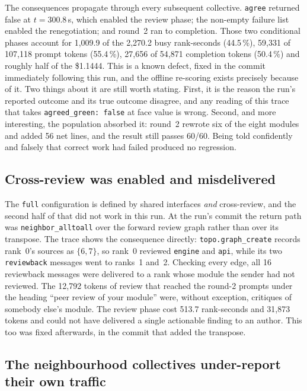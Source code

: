 \documentclass[11pt]{article}
\begin{document}
The consequences propagate through every subsequent collective. \texttt{agree} returned false
at $t=300.8$\,s, which enabled the review phase; the non-empty failure list enabled the
renegotiation; and round~2 ran to completion. Those two conditional phases account for 1{,}009.9
of the 2{,}270.2 busy rank-seconds (44.5\,\%), 59{,}331 of 107{,}118 prompt tokens (55.4\,\%),
27{,}656 of 54{,}871 completion tokens (50.4\,\%) and roughly half of the \$1.1444. This is a
known defect, fixed in the commit immediately following this run, and the offline re-scoring
exists precisely because of it. Two things about it are still worth stating. First, it is the
reason the run's reported outcome and its true outcome disagree, and any reading of this trace
that takes \texttt{agreed\_green: false} at face value is wrong. Second, and more interesting,
the population absorbed it: round~2 rewrote six of the eight modules and added 56 net lines,
and the result still passes 60/60. Being told confidently and falsely that correct work had
failed produced no regression.

\subsection*{Cross-review was enabled and misdelivered}

The \texttt{full} configuration is defined by shared interfaces \emph{and} cross-review, and
the second half of that did not work in this run. At the run's commit the return path was
\texttt{neighbor\_alltoall} over the forward review graph rather than over its transpose. The
trace shows the consequence directly: \texttt{topo.graph\_create} records rank~0's sources as
$\{6,7\}$, so rank~0 reviewed \texttt{engine} and \texttt{api}, while its two
\texttt{reviewback} messages went to ranks~1 and~2. Checking every edge, all 16 reviewback
messages were delivered to a rank whose module the sender had not reviewed. The 12{,}792 tokens
of review that reached the round-2 prompts under the heading ``peer review of your module''
were, without exception, critiques of somebody else's module. The review phase cost 513.7
rank-seconds and 31{,}873 tokens and could not have delivered a single actionable finding to
an author. This too was fixed afterwards, in the commit that added the transpose.

\subsection*{The neighbourhood collectives under-report their own traffic}
\end{document}

